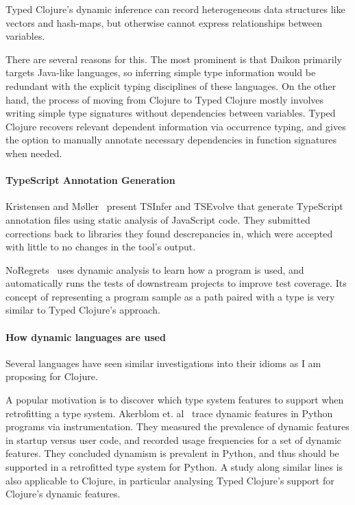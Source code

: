 \documentclass[11pt]{iuthesis}
\begin{document}
Typed Clojure's dynamic inference can record heterogeneous data structures
like vectors and hash-maps, but otherwise cannot express relationships
between variables.

There are several reasons for this. The most prominent is that Daikon
primarily targets Java-like languages, so inferring simple type information
would be redundant with the explicit typing disciplines of these languages.
On the other hand, the process of moving from Clojure to Typed Clojure
mostly involves writing simple type signatures without dependencies
between variables. Typed Clojure recovers relevant dependent information
via occurrence typing, and gives the option to manually annotate necessary
dependencies in function signatures when needed.


\paragraph{TypeScript Annotation Generation}
Kristensen and M{\o}ller~\cite{kristensen2017inference}
present TSInfer and TSEvolve that generate TypeScript annotation
files using static analysis of JavaScript code. They
submitted corrections back to libraries they found descrepancies in,
which were accepted with little to no changes in the tool's output.

NoRegrets~\cite{noregrets2018} uses dynamic analysis to learn how a program
is used, and automatically runs the tests of downstream projects to
improve test coverage. Its concept of representing a program sample as
a path paired with a type is very similar to Typed Clojure's approach.

\paragraph{How dynamic languages are used}
Several languages have seen similar investigations
into their idioms as I am proposing for Clojure.

A popular motivation is to discover which type system features to support
when retrofitting a type system.
Akerblom et. al~\cite{Akerblom:2014:TDF:2597073.2597103} trace dynamic features in Python programs
via instrumentation. They measured the prevalence of dynamic features in startup versus
user code, and recorded usage frequencies for a set of dynamic features.
They concluded dynamism is prevalent in Python, and thus should be supported
in a retrofitted type system for Python.
A study along similar lines is also applicable to Clojure, in particular analysing Typed
Clojure's support for Clojure's dynamic features.
\end{document}
